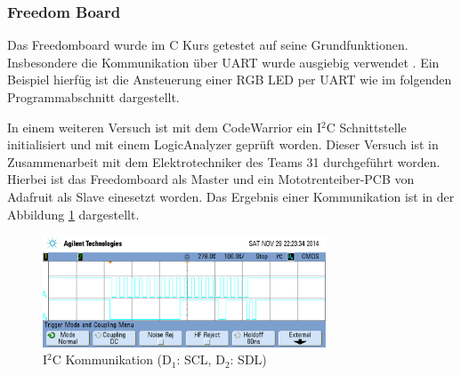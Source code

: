 \subsubsection{Freedom Board}
Das Freedomboard wurde im C Kurs getestet auf seine Grundfunktionen.
Insbesondere die Kommunikation über UART wurde ausgiebig verwendet
\cite{ninuxC}. Ein Beispiel hierfüg ist die Ansteuerung einer RGB LED
per UART wie im folgenden Programmabschnitt dargestellt.



In einem weiteren Versuch ist mit dem CodeWarrior ein I$^2$C Schnittstelle
initialisiert und mit einem LogicAnalyzer geprüft worden. Dieser Versuch ist
in Zusammenarbeit mit dem Elektrotechniker des Teams 31 durchgeführt worden.
Hierbei ist das Freedomboard als Master und ein Mototrenteiber-PCB von
Adafruit als Slave einesetzt worden. Das Ergebnis einer Kommunikation ist
in der Abbildung \ref{fig:frdm-i2c} dargestellt.

\begin{figure}[h!]
	\centering
	\includegraphics[width=0.75\textwidth]{../../fig/frdm-i2c_crop.pdf}
	\caption{I$^2$C Kommunikation (D$_1$: SCL, D$_2$: SDL)}
	\label{fig:frdm-i2c}
\end{figure}
